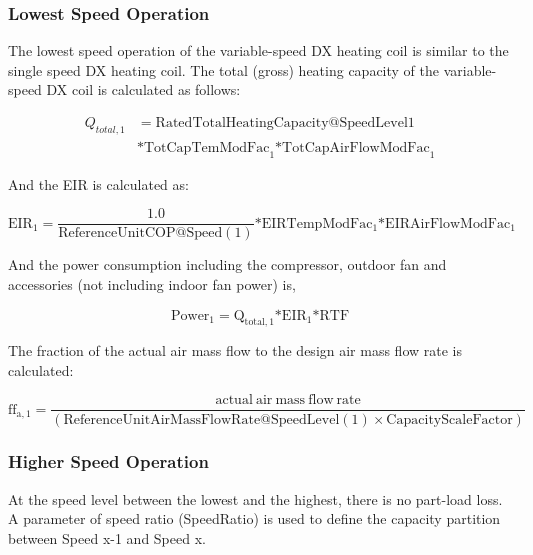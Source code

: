 \subsubsection{Lowest Speed Operation}\label{lowest-speed-operation-201605050922}

The lowest speed operation of the variable-speed DX heating coil is similar to the single speed DX heating coil. The total (gross) heating capacity of the variable-speed DX coil is calculated as follows:

\begin{equation}
  \begin{array}{rl}
    Q_{total,1} &= \mathrm{RatedTotalHeatingCapacity @ SpeedLevel 1} \\
                &* \mathrm{TotCapTemModFac}_1 \mathrm{* TotCapAirFlowModFac}_1
  \end{array}
\end{equation}

And the EIR is calculated as:

\begin{equation}
{\mathrm{EI}}{{\mathrm{R}}_1} = \frac{{1.0}}{{{\mathrm{ReferenceUnitCOP}}@{\mathrm{Speed}}(1)}}{\mathrm{*EIRTempModFa}}{{\mathrm{c}}_1}{\mathrm{*EIRAirFlowModFa}}{{\mathrm{c}}_1}
\end{equation}

And the power consumption including the compressor, outdoor fan and accessories (not including indoor fan power) is,

\begin{equation}
{\mathrm{Powe}}{{\mathrm{r}}_1} = {{\mathrm{Q}}_{{\mathrm{total}},1}}{\mathrm{*EI}}{{\mathrm{R}}_1}{\mathrm{*RTF}}
\end{equation}

The fraction of the actual air mass flow to the design air mass flow rate is calculated:

\begin{equation}
{\mathrm{f}}{{\mathrm{f}}_{{\mathrm{a}},1}} = \frac{{{\mathrm{actual~air~mass~flow~rate}}}}{{({\mathrm{ReferenceUnitAirMassFlowRate}}@{\mathrm{SpeedLevel}}(1) \times {\mathrm{CapacityScaleFactor}})}}
\end{equation}

\subsubsection{Higher Speed Operation}\label{higher-speed-operation-1-001}

At the speed level between the lowest and the highest, there is no part-load loss. A parameter of speed ratio (SpeedRatio) is used to define the capacity partition between Speed x-1 and Speed x.

